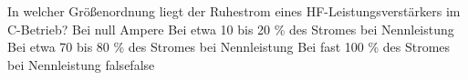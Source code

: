     {In welcher Größenordnung liegt der Ruhestrom eines HF-Leistungsverstärkers im C-Betrieb?}
    {Bei null Ampere}
    {Bei etwa 10 bis 20 \% des Stromes bei Nennleistung}
    {Bei etwa 70 bis 80 \% des Stromes bei Nennleistung}
    {Bei fast 100 \% des Stromes bei Nennleistung}
    {false}{false}
